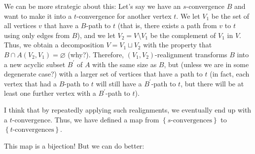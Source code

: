 \documentclass[numbers=enddot,12pt,final,onecolumn,notitlepage]{scrartcl}%
\theoremstyle{definition}
\theoremstyle{plainsl}
\begin{document}
We can be more strategic about this: Let's say we have an $s$-convergence $B$
and want to make it into a $t$-convergence for another vertex $t$. We let
$V_{1}$ be the set of all vertices $v$ that have a $B$-path to $t$ (that is,
there exists a path from $v$ to $t$ using only edges from $B$), and we let
$V_{2}=V\setminus V_{1}$ be the complement of $V_{1}$ in $V$. Thus, we obtain
a decomposition $V=V_{1}\sqcup V_{2}$ with the property that $B\cap A\left(
V_{2},V_{1}\right)  =\varnothing$ (why?). Therefore, $\left(  V_{1}%
,V_{2}\right)  $-realignment transforms $B$ into a new acyclic subset
$B^{\prime}$ of $A$ with the same size as $B$, but (unless we are in some
degenerate case?) with a larger set of vertices that have a path to $t$ (in
fact, each vertex that had a $B$-path to $t$ will still have a $B^{\prime}%
$-path to $t$, but there will be at least one further vertex with a
$B^{\prime}$-path to $t$).

I think that by repeatedly applying such realignments, we eventually end up
with a $t$-convergence. Thus, we have defined a map from $\left\{
s\text{-convergences}\right\}  $ to $\left\{  t\text{-convergences}\right\}  $.

This map is a bijection! But we can do better:
\end{document}
